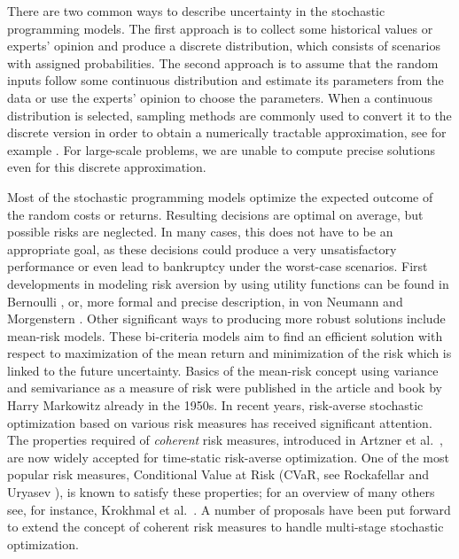 \documentclass{article}              %
\begin{document}
There are two common ways to describe uncertainty in the stochastic programming models. The first approach is to collect some historical values or experts' opinion and produce a discrete distribution, which consists of scenarios with assigned probabilities. The second approach is to assume that the random inputs follow some continuous distribution and estimate its parameters from the data or use the experts' opinion to choose the parameters. When a continuous distribution is selected, sampling methods are commonly used to convert it to the discrete version in order to obtain a numerically tractable approximation, see for example \cite{pflug2014multistage}. For large-scale problems, we are unable to compute precise solutions even for this discrete approximation. 

Most of the stochastic programming models optimize the expected outcome of the random costs or returns. Resulting decisions are optimal on average, but possible risks are neglected. In many cases, this does not have to be an appropriate goal, as these decisions could produce a very unsatisfactory performance or even lead to bankruptcy under the worst-case scenarios. First developments in modeling risk aversion by using utility functions can be found in Bernoulli \cite{bernoulli}, or, more formal and precise description, in von Neumann and Morgenstern \cite{neumann}. Other significant ways to producing more robust solutions include mean-risk models. These bi-criteria models aim to find an efficient solution with respect to maximization of the mean return and minimization of the risk which is linked to the future uncertainty. Basics of the mean-risk concept using  variance and semivariance as a measure of risk were published in the article \cite{markowitz_artic} and  book \cite{markowitz_book}  by Harry Markowitz already in the 1950s. In recent years, risk-averse stochastic optimization based on various risk measures has received significant attention. The properties required of {\em coherent} risk measures, introduced in Artzner et al.\ \cite{artzner_99}, are now widely accepted for time-static risk-averse optimization. One of the most popular risk measures, Conditional Value at Risk (CVaR, see Rockafellar and Uryasev \cite{R-U}), is known to satisfy these properties; for an overview of many others see, for instance, Krokhmal et al.\ \cite{K-U-Z}. A number of proposals have been put forward to extend the concept of coherent risk measures to handle multi-stage stochastic optimization.
\end{document}
